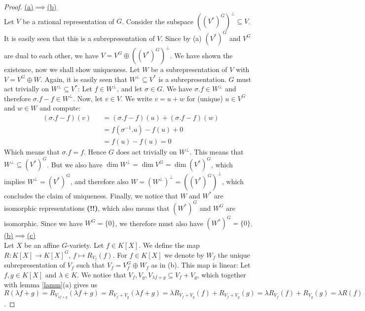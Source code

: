 \begin{proof}
  \hfill \break
  \underline{(a)$\implies$(b)}\\
  Let $V$ be a rational representation of $G$.
  Consider the subspace $ ((V^\ast)^G)^\bot \subseteq V $.
  It is easily seen that this is a subrepresentation of $V$.
  Since by (a) $(V^\ast)^G$ and $V^G$ are dual to each other, we have $V = V^G \oplus ((V^\ast)^G)^\bot $.
  We have shown the existence, now we shall show uniqueness.
  Let $W$ be a subrepresentation of $V$ with $V = V^G \oplus W $.
  Again, it is easily seen that $W^\bot \subseteq V^\ast$ is a subrepresentation.
  $G$ must act trivially on $W^\bot \subseteq V^\ast$:
  Let $f \in W^\bot$, and let $\sigma \in G$.
  We have $\sigma.f \in W^\bot$ and therefore $\sigma.f - f \in W^\bot$.
  Now, let $v \in V$.
  We write $v = u + w$ for (unique) $u \in V^G$ and $w \in W$ and compute:
  \begin{equation}
    \begin{aligned}
      &(\sigma.f -f)(v)&&=(\sigma.f -f)(u) + (\sigma.f -f)(w)\\
      &&&=f(\sigma^{-1}.u) - f(u) + 0\\
      &&&=f(u)-f(u) = 0
    \end{aligned}
  \end{equation}
  Which means that $\sigma.f = f$.
  Hence $G$ does act trivially on $W^\bot$.
  This means that $W^\bot \subseteq (V^\ast)^G$.
  But we also have $\operatorname{dim}W^\bot = \operatorname{dim}V^G = \operatorname{dim}(V^\ast)^G$, which implies $W^\bot = (V^\ast)^G$, and therefore also $W = (W^\bot)^\bot = ((V^\ast)^G)^\bot$, which concludes the claim of uniqueness.
  Finally, we notice that $W$ and $W^\ast$ are isomorphic representations \textbf{(!!)}, which also means that $(W^\ast)^G$ and $W^G$ are isomorphic.
  Since we have $W^G = \{0\}$, we therefore must also have $(W^\ast)^G = \{0\}$.\\
  \underline{(b)$\implies$(c)}\\
  Let $X$ be an affine $G$-variety.
  Let $f \in K[X]$.
  We define the map $R \colon K[X] \rightarrow K[X]^G $, $ f \mapsto R_{V_f}(f)$.
  For $f \in K[X]$ we denote by $W_f$ the unique subrepresentation of $V_f$ such that $V_f = V_f^G \oplus W_f$ as in (b).
  This map is linear:
  Let $f,g \in K[X]$ and $\lambda \in K$.
  We notice that $V_f,V_g,V_{\lambda f + g} \subseteq V_f + V_g$, which together with lemma \ref{lamm}(a) gives us $R(\lambda f +g) = R_{V_{\lambda f +g}}(\lambda f+g) = R_{V_f +V_g}(\lambda f+g) = \lambda R_{V_f + V_g} (f) + R_{V_f + V_g}(g) = \lambda R_{V_f} (f) + R_{V_g}(g) = \lambda R(f) + R(g)$.

\end{proof}
